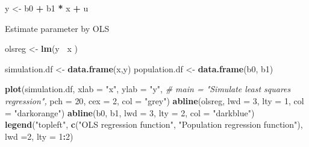 \documentclass[]{book}
\newenvironment{Shaded}{\begin{snugshade}}{\end{snugshade}}
\newcommand{\CommentTok}[1]{\textcolor[rgb]{0.56,0.35,0.01}{\textit{#1}}}
\newcommand{\DataTypeTok}[1]{\textcolor[rgb]{0.13,0.29,0.53}{#1}}
\newcommand{\DecValTok}[1]{\textcolor[rgb]{0.00,0.00,0.81}{#1}}
\newcommand{\KeywordTok}[1]{\textcolor[rgb]{0.13,0.29,0.53}{\textbf{#1}}}
\newcommand{\NormalTok}[1]{#1}
\newcommand{\OperatorTok}[1]{\textcolor[rgb]{0.81,0.36,0.00}{\textbf{#1}}}
\newcommand{\StringTok}[1]{\textcolor[rgb]{0.31,0.60,0.02}{#1}}
\begin{document}
\begin{Shaded}
\begin{Highlighting}[]
\NormalTok{y <-}\StringTok{ }\NormalTok{b0 }\OperatorTok{+}\StringTok{ }\NormalTok{b1 }\OperatorTok{*}\StringTok{ }\NormalTok{x }\OperatorTok{+}\StringTok{ }\NormalTok{u}
\end{Highlighting}
\end{Shaded}

Estimate parameter by OLS

\begin{Shaded}
\begin{Highlighting}[]
\NormalTok{olsreg <-}\StringTok{ }\KeywordTok{lm}\NormalTok{(y }\OperatorTok{~}\NormalTok{x )}
\end{Highlighting}
\end{Shaded}

\begin{Shaded}
\begin{Highlighting}[]
\NormalTok{simulation.df <-}\StringTok{ }\KeywordTok{data.frame}\NormalTok{(x,y)}
\NormalTok{population.df <-}\StringTok{ }\KeywordTok{data.frame}\NormalTok{(b0, b1)}
\end{Highlighting}
\end{Shaded}

\begin{Shaded}
\begin{Highlighting}[]
\KeywordTok{plot}\NormalTok{(simulation.df, }
     \DataTypeTok{xlab =} \StringTok{"x"}\NormalTok{,}
     \DataTypeTok{ylab =} \StringTok{"y"}\NormalTok{,}
     \CommentTok{# main = "Simulate least squares regression",}
     \DataTypeTok{pch  =} \DecValTok{20}\NormalTok{,}
     \DataTypeTok{cex  =} \DecValTok{2}\NormalTok{,}
     \DataTypeTok{col  =} \StringTok{"grey"}\NormalTok{)}
\KeywordTok{abline}\NormalTok{(olsreg, }\DataTypeTok{lwd =} \DecValTok{3}\NormalTok{, }\DataTypeTok{lty =} \DecValTok{1}\NormalTok{, }\DataTypeTok{col =} \StringTok{"darkorange"}\NormalTok{)}
\KeywordTok{abline}\NormalTok{(b0, b1,  }\DataTypeTok{lwd =} \DecValTok{3}\NormalTok{,  }\DataTypeTok{lty =} \DecValTok{2}\NormalTok{,   }\DataTypeTok{col =} \StringTok{"darkblue"}\NormalTok{)}
\KeywordTok{legend}\NormalTok{(}\StringTok{"topleft"}\NormalTok{, }
       \KeywordTok{c}\NormalTok{(}\StringTok{"OLS regression function"}\NormalTok{, }
         \StringTok{"Population regression function"}\NormalTok{), }
       \DataTypeTok{lwd =}\DecValTok{2}\NormalTok{, }
       \DataTypeTok{lty =} \DecValTok{1}\OperatorTok{:}\DecValTok{2}\NormalTok{)}
\end{Highlighting}
\end{Shaded}
\end{document}

